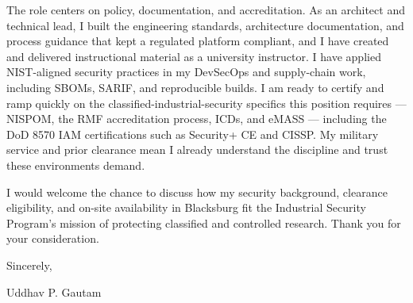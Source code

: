 \documentclass[11pt]{article}
\begin{document}
The role centers on policy, documentation, and accreditation. As an architect and technical lead, I built the engineering standards, architecture documentation, and process guidance that kept a regulated platform compliant, and I have created and delivered instructional material as a university instructor. I have applied NIST-aligned security practices in my DevSecOps and supply-chain work, including SBOMs, SARIF, and reproducible builds. I am ready to certify and ramp quickly on the classified-industrial-security specifics this position requires --- NISPOM, the RMF accreditation process, ICDs, and eMASS --- including the DoD 8570 IAM certifications such as Security+ CE and CISSP. My military service and prior clearance mean I already understand the discipline and trust these environments demand.

I would welcome the chance to discuss how my security background, clearance eligibility, and on-site availability in Blacksburg fit the Industrial Security Program's mission of protecting classified and controlled research. Thank you for your consideration.

\vspace{8pt}
Sincerely,

\vspace{22pt}
Uddhav P. Gautam
\end{document}
